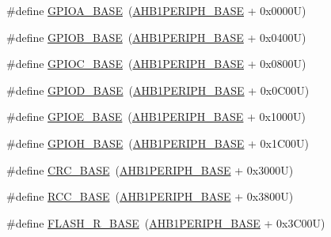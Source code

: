 \begin{DoxyCompactItemize}
\item 
\#define \hyperlink{group___peripheral__registers__structures_gad7723846cc5db8e43a44d78cf21f6efa}{G\+P\+I\+O\+A\+\_\+\+B\+A\+SE}~(\hyperlink{group___peripheral__memory__map_ga811a9a4ca17f0a50354a9169541d56c4}{A\+H\+B1\+P\+E\+R\+I\+P\+H\+\_\+\+B\+A\+SE} + 0x0000\+U)
\item 
\#define \hyperlink{group___peripheral__registers__structures_gac944a89eb789000ece920c0f89cb6a68}{G\+P\+I\+O\+B\+\_\+\+B\+A\+SE}~(\hyperlink{group___peripheral__memory__map_ga811a9a4ca17f0a50354a9169541d56c4}{A\+H\+B1\+P\+E\+R\+I\+P\+H\+\_\+\+B\+A\+SE} + 0x0400\+U)
\item 
\#define \hyperlink{group___peripheral__registers__structures_ga26f267dc35338eef219544c51f1e6b3f}{G\+P\+I\+O\+C\+\_\+\+B\+A\+SE}~(\hyperlink{group___peripheral__memory__map_ga811a9a4ca17f0a50354a9169541d56c4}{A\+H\+B1\+P\+E\+R\+I\+P\+H\+\_\+\+B\+A\+SE} + 0x0800\+U)
\item 
\#define \hyperlink{group___peripheral__registers__structures_ga1a93ab27129f04064089616910c296ec}{G\+P\+I\+O\+D\+\_\+\+B\+A\+SE}~(\hyperlink{group___peripheral__memory__map_ga811a9a4ca17f0a50354a9169541d56c4}{A\+H\+B1\+P\+E\+R\+I\+P\+H\+\_\+\+B\+A\+SE} + 0x0\+C00\+U)
\item 
\#define \hyperlink{group___peripheral__registers__structures_gab487b1983d936c4fee3e9e88b95aad9d}{G\+P\+I\+O\+E\+\_\+\+B\+A\+SE}~(\hyperlink{group___peripheral__memory__map_ga811a9a4ca17f0a50354a9169541d56c4}{A\+H\+B1\+P\+E\+R\+I\+P\+H\+\_\+\+B\+A\+SE} + 0x1000\+U)
\item 
\#define \hyperlink{group___peripheral__registers__structures_gaee4716389f3a1c727495375b76645608}{G\+P\+I\+O\+H\+\_\+\+B\+A\+SE}~(\hyperlink{group___peripheral__memory__map_ga811a9a4ca17f0a50354a9169541d56c4}{A\+H\+B1\+P\+E\+R\+I\+P\+H\+\_\+\+B\+A\+SE} + 0x1\+C00\+U)
\item 
\#define \hyperlink{group___peripheral__registers__structures_ga656a447589e785594cbf2f45c835ad7e}{C\+R\+C\+\_\+\+B\+A\+SE}~(\hyperlink{group___peripheral__memory__map_ga811a9a4ca17f0a50354a9169541d56c4}{A\+H\+B1\+P\+E\+R\+I\+P\+H\+\_\+\+B\+A\+SE} + 0x3000\+U)
\item 
\#define \hyperlink{group___peripheral__registers__structures_ga0e681b03f364532055d88f63fec0d99d}{R\+C\+C\+\_\+\+B\+A\+SE}~(\hyperlink{group___peripheral__memory__map_ga811a9a4ca17f0a50354a9169541d56c4}{A\+H\+B1\+P\+E\+R\+I\+P\+H\+\_\+\+B\+A\+SE} + 0x3800\+U)
\item 
\#define \hyperlink{group___peripheral__registers__structures_ga8e21f4845015730c5731763169ec0e9b}{F\+L\+A\+S\+H\+\_\+\+R\+\_\+\+B\+A\+SE}~(\hyperlink{group___peripheral__memory__map_ga811a9a4ca17f0a50354a9169541d56c4}{A\+H\+B1\+P\+E\+R\+I\+P\+H\+\_\+\+B\+A\+SE} + 0x3\+C00\+U)

\end{DoxyCompactItemize}

